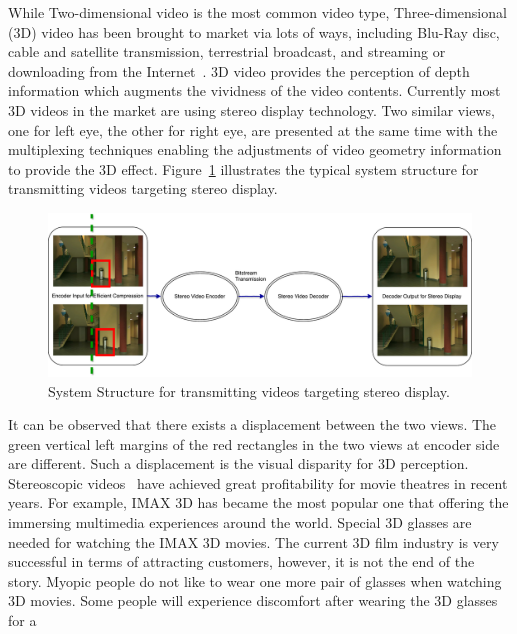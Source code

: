 While Two-dimensional video is the most common video type,
Three-dimensional (3D) video has been brought to market via lots of ways,
including Blu-Ray disc, cable and satellite transmission, terrestrial
broadcast, and streaming or downloading from the Internet~\parencite{RN118}.
3D video provides the perception of depth information which augments
the vividness of the video contents.
Currently most 3D videos in the market are using stereo display technology.
Two similar views, one for left eye, the other for right eye, are presented
at the same time with the multiplexing techniques enabling the
adjustments of video geometry information~\parencite{RN196} to provide
the 3D effect.
Figure~\ref{fig:stereo-display} illustrates the typical system structure for
transmitting videos targeting stereo display.
\begin{figure}
    \centering
    \includegraphics[width=\textwidth,height=\textheight,keepaspectratio]{Figures/StereoDisplay.pdf}
    \caption[System Structure for transmitting videos targeting stereo display]{System Structure for transmitting videos targeting stereo display.}
    \label{fig:stereo-display}
\end{figure}
It can be observed that there exists a displacement between the
two views.
The green vertical left margins of the red rectangles in the two views
at encoder side are different.
Such a displacement is the visual disparity for 3D perception.
Stereoscopic videos~\parencite{RN153} have
achieved great profitability for movie theatres in recent years.
For example, IMAX 3D has became the most popular one that offering
the immersing multimedia experiences around the world.
Special 3D glasses are needed for watching the IMAX 3D movies.
The current 3D film industry is very successful in terms of attracting
customers, however, it is not the end of the story.
Myopic people do not like to wear one more pair of glasses when
watching 3D movies.
Some people will experience discomfort after wearing the 3D glasses for a
